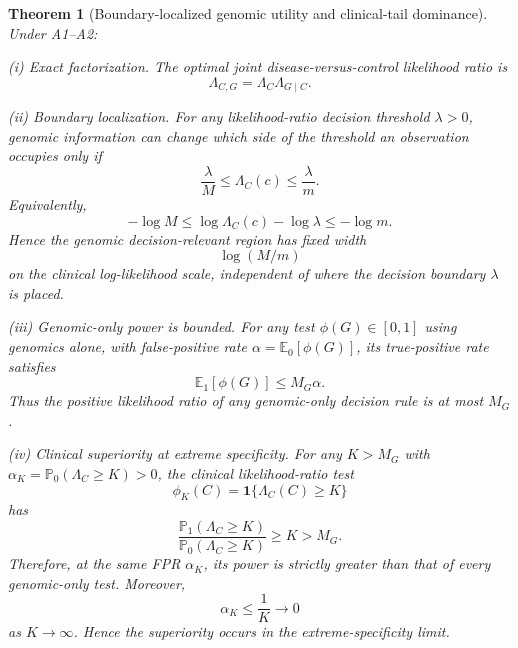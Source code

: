 \documentclass[journal]{IEEEtran}
\newtheorem{theorem}{Theorem}
\newcommand{\Pone}{\mathbb{P}_1}
\newcommand{\Pzero}{\mathbb{P}_0}
\newcommand{\Eone}{\mathbb{E}_1}
\newcommand{\Ezero}{\mathbb{E}_0}
\newcommand{\LR}{\Lambda}
\newcommand{\ind}{\mathbf{1}}
\begin{document}
\begin{theorem}[Boundary-localized genomic utility and clinical-tail dominance]
\label{thm:main}
Under A1--A2:

\emph{(i) Exact factorization.} The optimal joint disease-versus-control likelihood ratio is
\begin{equation}
\LR_{C,G}=\LR_C\LR_{G\mid C}.
\end{equation}

\emph{(ii) Boundary localization.} For any likelihood-ratio decision threshold $\lambda>0$, genomic information can change which side of the threshold an observation occupies only if
\begin{equation}
\boxed{
\frac{\lambda}{M}
\le \LR_C(c)
\le \frac{\lambda}{m}.
}
\label{eq:boundaryband}
\end{equation}
Equivalently,
\begin{equation}
\boxed{
-\log M
\le
\log \LR_C(c)-\log\lambda
\le
-\log m.
}
\label{eq:logboundaryband}
\end{equation}
Hence the genomic decision-relevant region has fixed width
\begin{equation}
\log(M/m)
\end{equation}
on the clinical log-likelihood scale, independent of where the decision boundary $\lambda$ is placed.

\emph{(iii) Genomic-only power is bounded.} For any test $\phi(G)\in[0,1]$ using genomics alone, with false-positive rate $\alpha=\Ezero[\phi(G)]$, its true-positive rate satisfies
\begin{equation}
\boxed{
\Eone[\phi(G)]\le M_G\alpha.
}
\label{eq:genomicpowerbound}
\end{equation}
Thus the positive likelihood ratio of any genomic-only decision rule is at most $M_G$.

\emph{(iv) Clinical superiority at extreme specificity.} For any $K>M_G$ with $\alpha_K=\Pzero(\LR_C\ge K)>0$, the clinical likelihood-ratio test
\begin{equation}
\phi_K(C)=\ind\{\LR_C(C)\ge K\}
\end{equation}
has
\begin{equation}
\frac{\Pone(\LR_C\ge K)}{\Pzero(\LR_C\ge K)}\ge K>M_G.
\label{eq:clinicalLRplus}
\end{equation}
Therefore, at the same FPR $\alpha_K$, its power is strictly greater than that of every genomic-only test. Moreover,
\begin{equation}
\alpha_K\le \frac{1}{K}\to0
\end{equation}
as $K\to\infty$. Hence the superiority occurs in the extreme-specificity limit.


\end{theorem}
\end{document}
